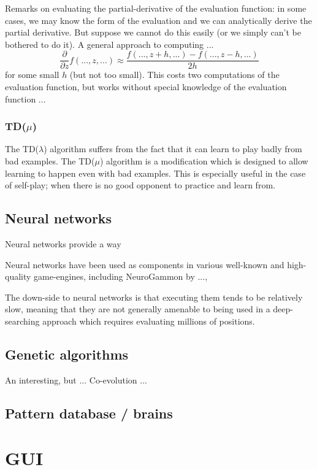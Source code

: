 \documentclass[10pt,dvipdfmx,letterpaper]{report}
\begin{document}
Remarks on evaluating the partial-derivative of the evaluation function: in some cases,
we may know the form of the evaluation and we can analytically derive the partial derivative.
But suppose we cannot do this easily (or we simply can't be bothered to do it).
A general approach to computing ...
\[ \frac{\partial}{\partial z}f(..., z, ...) \approx \frac{f(..., z+h, ...) - f(..., z-h, ...)}{2h} \]
for some small $h$ (but not too small).  This costs two computations of the evaluation function, but
works without special knowledge of the evaluation function ...

\subsection{TD($\mu$)}
The TD($\lambda$) algorithm suffers from the fact that it can learn to play
badly from bad examples.  The TD($\mu$) algorithm is a modification which is
designed to allow learning to happen even with bad examples.  This is especially
useful in the case of self-play; when there is no good opponent to practice and
learn from.

\section{Neural networks}
Neural networks provide a way 

Neural networks have been used as components in various well-known and high-quality
game-engines, including NeuroGammon by ..., 

The down-side to neural networks is that executing them tends to be relatively slow, meaning that
they are not generally amenable to being used in a deep-searching approach which requires evaluating
millions of positions.

\section{Genetic algorithms}
An interesting, but ...
Co-evolution ...
\section{Pattern database / brains}

\chapter{GUI}
\label{chap-gui}
\end{document}
